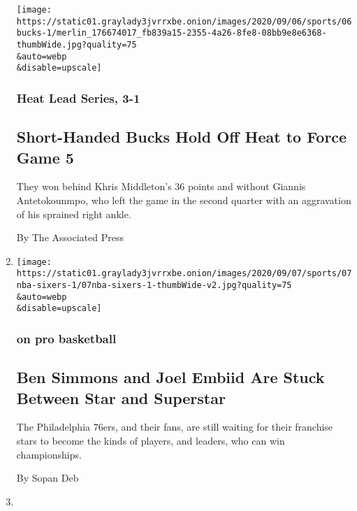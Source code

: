 \begin{enumerate}
  \texttt{[image: https://static01.graylady3jvrrxbe.onion/images/2020/09/06/sports/06bucks-1/merlin\_176674017\_fb839a15-2355-4a26-8fe8-08bb9e8e6368-thumbWide.jpg?quality=75\\\&auto=webp\\\&disable=upscale]}

  \hypertarget{heat-lead-series-3-1}{%
  \subsubsection{Heat Lead Series, 3-1}\label{heat-lead-series-3-1}}

  \hypertarget{short-handed-bucks-hold-off-heat-to-force-game-5}{%
  \subsection{Short-Handed Bucks Hold Off Heat to Force Game
  5}\label{short-handed-bucks-hold-off-heat-to-force-game-5}}

  They won behind Khris Middleton's 36 points and without Giannis
  Antetokounmpo, who left the game in the second quarter with an
  aggravation of his sprained right ankle.

  By The Associated Press
\item
  \href{/2020/09/06/sports/basketball/nba-sixers-embiid-simmons.html}{}

  \texttt{[image: https://static01.graylady3jvrrxbe.onion/images/2020/09/07/sports/07nba-sixers-1/07nba-sixers-1-thumbWide-v2.jpg?quality=75\\\&auto=webp\\\&disable=upscale]}

  \hypertarget{on-pro-basketball-1}{%
  \subsubsection{on pro basketball}\label{on-pro-basketball-1}}

  \hypertarget{ben-simmons-and-joel-embiid-are-stuck-between-star-and-superstar}{%
  \subsection{Ben Simmons and Joel Embiid Are Stuck Between Star and
  Superstar}\label{ben-simmons-and-joel-embiid-are-stuck-between-star-and-superstar}}

  The Philadelphia 76ers, and their fans, are still waiting for their
  franchise stars to become the kinds of players, and leaders, who can
  win championships.

  By Sopan Deb
\item
  \href{/2020/09/05/sports/basketball/nba-bucks-heat.html}{}


\end{enumerate}
